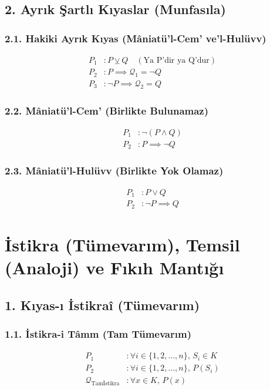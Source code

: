\documentclass[11pt, a4paper]{article}
\begin{document}
\subsection{2. Ayrık Şartlı Kıyaslar (Munfasıla)}

\subsubsection{2.1. Hakiki Ayrık Kıyas (Mâniatü'l-Cem' ve'l-Hulüvv)}
\begin{align}
P_1 &: P \veebar Q \quad (\text{Ya P'dir ya Q'dur}) \\
P_2 &: P \implies \mathcal{Q}_1 = \neg Q \\
P_3 &: \neg P \implies \mathcal{Q}_2 = Q
\end{align}

\subsubsection{2.2. Mâniatü'l-Cem' (Birlikte Bulunamaz)}
\begin{align}
P_1 &: \neg (P \land Q) \\
P_2 &: P \implies \neg Q
\end{align}

\subsubsection{2.3. Mâniatü'l-Hulüvv (Birlikte Yok Olamaz)}
\begin{align}
P_1 &: P \lor Q \\
P_2 &: \neg P \implies Q
\end{align}

\section{İstikra (Tümevarım), Temsil (Analoji) ve Fıkıh Mantığı}

\subsection{1. Kıyas-ı İstikraî (Tümevarım)}

\subsubsection{1.1. İstikra-i Tâmm (Tam Tümevarım)}
\begin{align}
P_1 &: \forall i \in \{1, 2, \dots, n\}, \, S_i \in K \\
P_2 &: \forall i \in \{1, 2, \dots, n\}, \, P(S_i) \\
\mathcal{Q}_{\text{Tamİstikra}} &: \forall x \in K, \, P(x)
\end{align}
\end{document}
